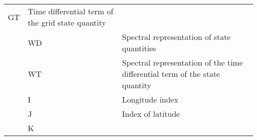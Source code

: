 \begin{longtable}[]{@{}lll@{}}
\begin{minipage}[t]{0.30\columnwidth}
GT\strut
\end{minipage} & \begin{minipage}[t]{0.30\columnwidth}\raggedright
Time differential term of the grid state quantity\strut
\end{minipage}\tabularnewline
\begin{minipage}[t]{0.30\columnwidth}\raggedright
\strut
\end{minipage} & \begin{minipage}[t]{0.30\columnwidth}\raggedright
WD\strut
\end{minipage} & \begin{minipage}[t]{0.30\columnwidth}\raggedright
Spectral representation of state quantities\strut
\end{minipage}\tabularnewline
\begin{minipage}[t]{0.30\columnwidth}\raggedright
\strut
\end{minipage} & \begin{minipage}[t]{0.30\columnwidth}\raggedright
WT\strut
\end{minipage} & \begin{minipage}[t]{0.30\columnwidth}\raggedright
Spectral representation of the time differential term of the state
quantity\strut
\end{minipage}\tabularnewline
\begin{minipage}[t]{0.30\columnwidth}\raggedright
\strut
\end{minipage} & \begin{minipage}[t]{0.30\columnwidth}\raggedright
I\strut
\end{minipage} & \begin{minipage}[t]{0.30\columnwidth}\raggedright
Longitude index\strut
\end{minipage}\tabularnewline
\begin{minipage}[t]{0.30\columnwidth}\raggedright
\strut
\end{minipage} & \begin{minipage}[t]{0.30\columnwidth}\raggedright
J\strut
\end{minipage} & \begin{minipage}[t]{0.30\columnwidth}\raggedright
Index of latitude\strut
\end{minipage}\tabularnewline
\begin{minipage}[t]{0.30\columnwidth}\raggedright
\strut
\end{minipage} & \begin{minipage}[t]{0.30\columnwidth}\raggedright
K\strut
\end{minipage} & \begin{minipage}[t]{0.30\columnwidth}\raggedright

\end{minipage}
\end{longtable}
